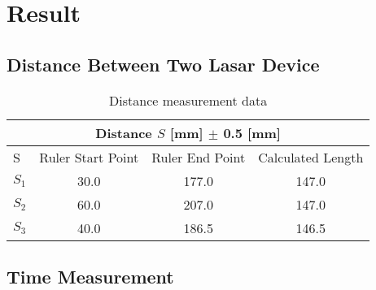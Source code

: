 \section{Result}
\subsection{Distance Between Two Lasar Device}

\begin{table}[H]
  \centering
  \begin{tabular}{|l|c |c |c |}
    \hline
    \multicolumn{4}{|c|}{Distance $S$ [mm] $\pm$ 0.5 [mm]} \\
    \hline
    S &  Ruler Start Point & Ruler End Point & Calculated Length \\
    \hline
    $S_1$ & 30.0 & 177.0 & 147.0 \\ 
    \hline
    $S_2$ & 60.0 & 207.0 & 147.0 \\ 
    \hline
    $S_3$ & 40.0 & 186.5 & 146.5 \\ 
    \hline
  \end{tabular}
  \caption{Distance measurement data}
\end{table}


\subsection{Time Measurement}

